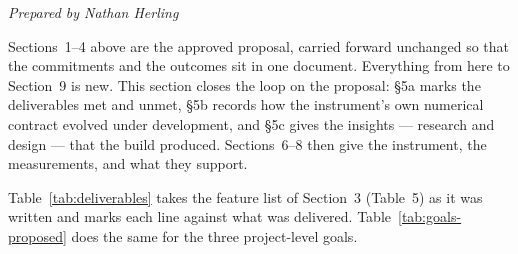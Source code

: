 \documentclass[11pt]{article}
\newcommand{\preparedby}{%
  \par\nobreak\vspace{-6pt}%
  {\footnotesize\itshape\color{forgemute}Prepared by Nathan Herling}%
  \par\vspace{4pt}}
\begin{document}
\preparedby
\newsection

Sections~1--4 above are the approved proposal, carried forward unchanged so that
the commitments and the outcomes sit in one document. Everything from here to
Section~9 is new. This section closes the loop on the proposal: \S5a marks the
deliverables met and unmet, \S5b records how the instrument's own numerical
contract evolved under development, and \S5c gives the insights --- research and
design --- that the build produced. Sections~6--8 then give the instrument, the
measurements, and what they support.


Table~\ref{tab:deliverables} takes the feature list of Section~3 (Table~5) as it
was written and marks each line against what was delivered. Table~\ref{tab:goals-proposed}
does the same for the three project-level goals.
\end{document}
